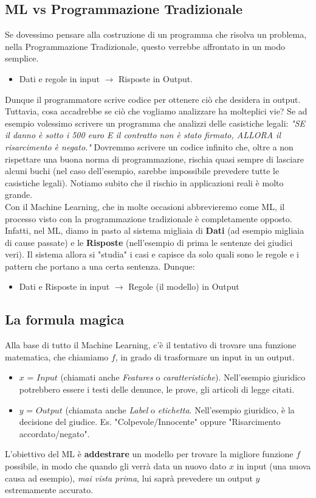\documentclass{article}
\begin{document}
\subsection{ML vs Programmazione Tradizionale}
Se dovessimo pensare alla costruzione di un programma che risolva un problema, nella Programmazione Tradizionale, questo verrebbe affrontato in un modo semplice.
\begin{itemize}
    \item Dati e regole in input $\rightarrow$ Risposte in Output.

\end{itemize}
Dunque il programmatore scrive codice per ottenere ciò che desidera in output. Tuttavia, cosa accadrebbe se ciò che vogliamo analizzare ha molteplici vie?
Se ad esempio volessimo scrivere un programma che analizzi delle casistiche legali:
\textit{"SE il danno è sotto i 500 euro E il contratto non è stato firmato, ALLORA il risarcimento è negato."}
Dovremmo scrivere un codice infinito che, oltre a non rispettare una buona norma di programmazione, rischia quasi sempre di lasciare alcuni buchi (nel caso dell'esempio, sarebbe impossibile prevedere tutte le casistiche legali). 
Notiamo subito che il rischio in applicazioni reali è molto grande.\\
Con il Machine Learning, che in molte occasioni abbrevieremo come ML, il processo visto con la programmazione tradizionale è completamente opposto. Infatti, nel ML, diamo in pasto al sistema migliaia di \textbf{Dati} (ad esempio migliaia di cause passate) e le \textbf{Risposte} (nell'esempio di prima le sentenze dei giudici veri). Il sistema allora si "studia" i casi e capisce da solo quali sono le regole e i pattern che portano a una certa sentenza. Dunque:
\begin{itemize}
    \item Dati e Risposte in input $\rightarrow$ Regole (il modello) in Output
\end{itemize}


\subsection{La formula magica}
Alla base di tutto il Machine Learning, c'è il tentativo di trovare una funzione matematica, che chiamiamo $f$, in grado di trasformare un input in un output. 
\begin{itemize}
    \item $x$ = $Input$ (chiamati anche \textit{Features} o \textit{caratteristiche}). Nell'esempio giuridico potrebbero essere i testi delle denunce, le prove, gli articoli di legge citati.

    \item $y$ = $Output$ (chiamata anche \textit{Label} o \textit{etichetta}. Nell'esempio giuridico, è la decisione del giudice.
    Es. "Colpevole/Innocente" oppure "Risarcimento accordato/negato".
\end{itemize}
    L'obiettivo del ML è \textbf{addestrare} un modello per trovare la migliore funzione $f$ possibile, in modo che quando gli verrà data un nuovo dato $x$ in input  (una nuova causa ad esempio), \textit{mai vista prima}, lui saprà prevedere un output $y$ estremamente accurato.
\end{document}
